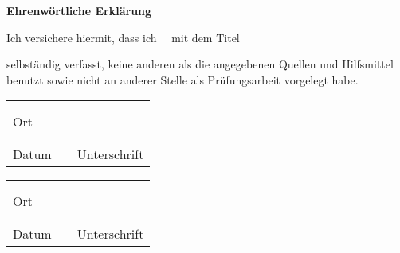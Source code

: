 \pagestyle{plain}


\textbf{{\Large Ehrenwörtliche Erklärung}}
\vspace{2cm}

{\newcommand{\DocumentArticle}{meinen}}
{
	{\newcommand{\DocumentWord}{meine}}
	{
		{\newcommand{\DocumentArticle}{meine}}
		{
			{\newcommand{\DocumentArticle}{meine}}
			{\newcommand{\DocumentArticle}{meine/n}}
		}
	}
}

Ich versichere hiermit, dass ich \DocumentArticle\ \DocumentType \ mit dem Titel
\vspace{1cm}

\textbf{\Titel}

\vspace{1cm}
selbständig verfasst, keine anderen als die angegebenen Quellen und Hilfsmittel benutzt
sowie nicht an anderer Stelle als Prüfungsarbeit vorgelegt habe.
\vfill

\begin{table*}[hp]
	\centering
	\begin{tabular}{L{6cm}L{2cm}L{6cm}}
		      &   &              \\
		      &   &              \\ 
		Ort   &                  \\
		      &   &              \\
		      &   &              \\  
		Datum &   & Unterschrift \\
	\end{tabular}
\end{table*}

\vspace{3cm}

\begin{table*}[hp]
	\centering
	\begin{tabular}{L{6cm}L{2cm}L{6cm}}
		      &   &              \\
		      &   &              \\ 
		Ort   &                  \\
		      &   &              \\
		      &   &              \\  
		Datum &   & Unterschrift \\
	\end{tabular}
\end{table*}